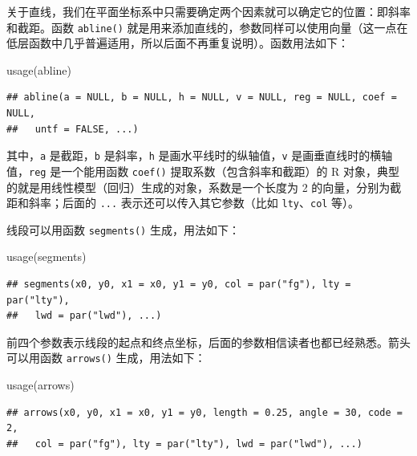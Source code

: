 \documentclass[
  b5paper,
  UTF8,twoside]{book}
\newenvironment{Shaded}{\begin{snugshade}}{\end{snugshade}}
\newcommand{\FunctionTok}[1]{\textcolor[rgb]{0.00,0.00,0.00}{#1}}
\newcommand{\NormalTok}[1]{#1}
\begin{document}
关于直线，我们在平面坐标系中只需要确定两个因素就可以确定它的位置：即斜率和截距。函数 \texttt{abline()} 就是用来添加直线的，参数同样可以使用向量（这一点在低层函数中几乎普遍适用，所以后面不再重复说明）。函数用法如下：

\begin{Shaded}
\begin{Highlighting}[]
\FunctionTok{usage}\NormalTok{(abline)}
\end{Highlighting}
\end{Shaded}

\begin{verbatim}
## abline(a = NULL, b = NULL, h = NULL, v = NULL, reg = NULL, coef = NULL,
##   untf = FALSE, ...)
\end{verbatim}

其中，\texttt{a} 是截距，\texttt{b} 是斜率，\texttt{h} 是画水平线时的纵轴值，\texttt{v} 是画垂直线时的横轴值，\texttt{reg} 是一个能用函数 \texttt{coef()} 提取系数（包含斜率和截距）的 R 对象，典型的就是用线性模型（回归）生成的对象，系数是一个长度为 2 的向量，分别为截距和斜率；后面的 \texttt{...} 表示还可以传入其它参数（比如 \texttt{lty}、\texttt{col} 等）。

线段可以用函数 \texttt{segments()} 生成，用法如下：

\begin{Shaded}
\begin{Highlighting}[]
\FunctionTok{usage}\NormalTok{(segments)}
\end{Highlighting}
\end{Shaded}

\begin{verbatim}
## segments(x0, y0, x1 = x0, y1 = y0, col = par("fg"), lty = par("lty"),
##   lwd = par("lwd"), ...)
\end{verbatim}

前四个参数表示线段的起点和终点坐标，后面的参数相信读者也都已经熟悉。箭头可以用函数 \texttt{arrows()} 生成，用法如下：

\begin{Shaded}
\begin{Highlighting}[]
\FunctionTok{usage}\NormalTok{(arrows)}
\end{Highlighting}
\end{Shaded}

\begin{verbatim}
## arrows(x0, y0, x1 = x0, y1 = y0, length = 0.25, angle = 30, code = 2,
##   col = par("fg"), lty = par("lty"), lwd = par("lwd"), ...)
\end{verbatim}
\end{document}
